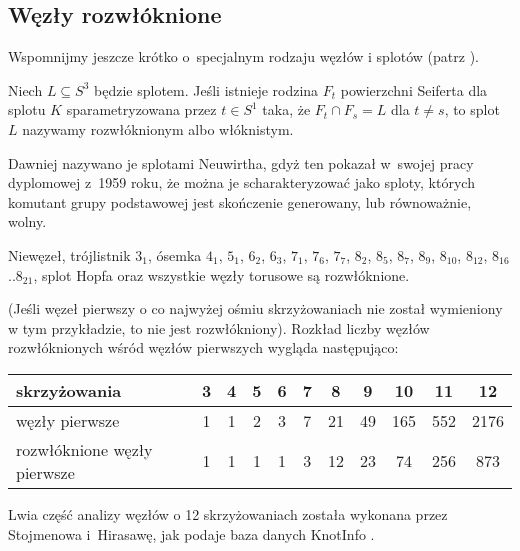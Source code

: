 
\subsection{Węzły rozwłóknione}
%
%
Wspomnijmy jeszcze krótko o~specjalnym rodzaju węzłów i splotów (patrz \cite[s. 49-50]{kawauchi1996}).

\begin{definition}
    Niech $L \subseteq S^3$ będzie splotem.
    Jeśli istnieje rodzina $F_t$ powierzchni Seiferta dla splotu $K$ sparametryzowana przez $t \in S^1$ taka, że $F_t \cap F_s = L$ dla $t \neq s$, to splot $L$ nazywamy rozwłóknionym albo włóknistym.
\end{definition}

%
Dawniej nazywano je splotami Neuwirtha, gdyż ten pokazał w~swojej pracy dyplomowej z~1959 roku, że można je scharakteryzować jako sploty, których komutant grupy podstawowej jest skończenie generowany, lub równoważnie, wolny.

\begin{example}
    Niewęzeł, trójlistnik $3_1$, ósemka $4_1$, $5_{1}$, $6_{2}$, $6_{3}$, $7_{1}$, $7_{6}$, $7_{7}$, $8_{2}$, $8_{5}$, $8_{7}$, $8_{9}$, $8_{10}$, $8_{12}$, $8_{16}$..$8_{21}$, splot Hopfa oraz wszystkie węzły torusowe są rozwłóknione.
\end{example}

(Jeśli węzeł pierwszy o co najwyżej ośmiu skrzyżowaniach nie został wymieniony w tym przykładzie, to nie jest rozwłókniony).
Rozkład liczby węzłów rozwłóknionych wśród węzłów pierwszych wygląda następująco:

\renewcommand*{\arraystretch}{1.4}
\footnotesize
\begin{longtable}{lcccccccccc}
    \hline
    \textbf{skrzyżowania} & 3 & 4 & 5 & 6 & 7 & 8 & 9 & 10 &  11 &  12 \\ \hline \endhead
    węzły pierwsze & 1 & 1 & 2 & 3 & 7 & 21 & 49 & 165 & 552 & 2176 \\
    rozwłóknione węzły pierwsze & 1 & 1 & 1 & 1 & 3 & 12 & 23 & 74 & 256 & 873 \\
    \hline
\end{longtable}
\normalsize

Lwia część analizy węzłów o 12 skrzyżowaniach została wykonana przez Stojmenowa i~Hirasawę, jak podaje baza danych KnotInfo \cite{knotinfo2024}.
%
%

